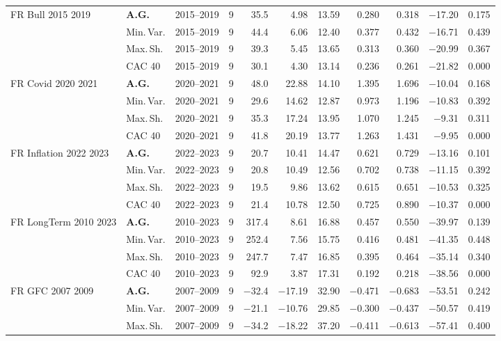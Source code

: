 \begin{longtable}{p{2.6cm} l c c r r r r r r r}
FR Bull 2015 2019 & \textbf{A.G.} & 2015--2019 & 9 & 35.5 & 4.98 & 13.59 & 0.280 & 0.318 & $-$17.20 & 0.175 \\
 & Min.\,Var. & 2015--2019 & 9 & 44.4 & 6.06 & 12.40 & 0.377 & 0.432 & $-$16.71 & 0.439 \\
 & Max.\,Sh. & 2015--2019 & 9 & 39.3 & 5.45 & 13.65 & 0.313 & 0.360 & $-$20.99 & 0.367 \\
 & CAC 40 & 2015--2019 & 9 & 30.1 & 4.30 & 13.14 & 0.236 & 0.261 & $-$21.82 & 0.000 \\
\midrule
FR Covid 2020 2021 & \textbf{A.G.} & 2020--2021 & 9 & 48.0 & 22.88 & 14.10 & 1.395 & 1.696 & $-$10.04 & 0.168 \\
 & Min.\,Var. & 2020--2021 & 9 & 29.6 & 14.62 & 12.87 & 0.973 & 1.196 & $-$10.83 & 0.392 \\
 & Max.\,Sh. & 2020--2021 & 9 & 35.3 & 17.24 & 13.95 & 1.070 & 1.245 & $-$9.31 & 0.311 \\
 & CAC 40 & 2020--2021 & 9 & 41.8 & 20.19 & 13.77 & 1.263 & 1.431 & $-$9.95 & 0.000 \\
\midrule
FR Inflation 2022 2023 & \textbf{A.G.} & 2022--2023 & 9 & 20.7 & 10.41 & 14.47 & 0.621 & 0.729 & $-$13.16 & 0.101 \\
 & Min.\,Var. & 2022--2023 & 9 & 20.8 & 10.49 & 12.56 & 0.702 & 0.738 & $-$11.15 & 0.392 \\
 & Max.\,Sh. & 2022--2023 & 9 & 19.5 & 9.86 & 13.62 & 0.615 & 0.651 & $-$10.53 & 0.325 \\
 & CAC 40 & 2022--2023 & 9 & 21.4 & 10.78 & 12.50 & 0.725 & 0.890 & $-$10.37 & 0.000 \\
\midrule
FR LongTerm 2010 2023 & \textbf{A.G.} & 2010--2023 & 9 & 317.4 & 8.61 & 16.88 & 0.457 & 0.550 & $-$39.97 & 0.139 \\
 & Min.\,Var. & 2010--2023 & 9 & 252.4 & 7.56 & 15.75 & 0.416 & 0.481 & $-$41.35 & 0.448 \\
 & Max.\,Sh. & 2010--2023 & 9 & 247.7 & 7.47 & 16.85 & 0.395 & 0.464 & $-$35.14 & 0.340 \\
 & CAC 40 & 2010--2023 & 9 & 92.9 & 3.87 & 17.31 & 0.192 & 0.218 & $-$38.56 & 0.000 \\
\midrule
FR GFC 2007 2009 & \textbf{A.G.} & 2007--2009 & 9 & $-$32.4 & $-$17.19 & 32.90 & $-$0.471 & $-$0.683 & $-$53.51 & 0.242 \\
 & Min.\,Var. & 2007--2009 & 9 & $-$21.1 & $-$10.76 & 29.85 & $-$0.300 & $-$0.437 & $-$50.57 & 0.419 \\
 & Max.\,Sh. & 2007--2009 & 9 & $-$34.2 & $-$18.22 & 37.20 & $-$0.411 & $-$0.613 & $-$57.41 & 0.400 \\

\end{longtable}
